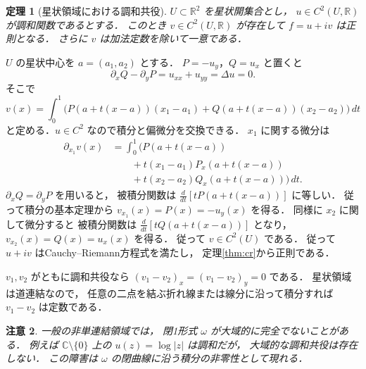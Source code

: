 \documentclass[a5paper,10pt,onecolumn]{jsarticle}
\makeatletter
\theoremstyle{mathnotetheorem}
\newtheorem{theorem}{定理}[section]
\newtheorem{remark}[theorem]{注意}
\renewcommand{\proofname}{証明}
\renewenvironment{proof}[1][\proofname]{%
  \par\pushQED{\qed}\normalfont\topsep4\p@\@plus2\p@\relax
  \trivlist\item[\hskip\labelsep\bfseries #1]\ignorespaces
}{\popQED\endtrivlist\@endpefalse}
\makeatother
\begin{document}
\begin{theorem}[星状領域における調和共役]\label{thm:conjugate}
$U\subset\mathbb R^2$ を星状開集合とし，
$u\in C^2(U,\mathbb R)$ が調和関数であるとする．
このとき $v\in C^2(U,\mathbb R)$ が存在して
$f=u+iv$ は正則となる．
さらに $v$ は加法定数を除いて一意である．
\end{theorem}
\begin{proof}
$U$ の星状中心を $a=(a_1,a_2)$ とする．
$P=-u_y$，$Q=u_x$ と置くと
\[
 \partial_xQ-\partial_yP=u_{xx}+u_{yy}=\Delta u=0.
\]
そこで
\[
 v(x)=\int_0^1
 \bigl(P(a+t(x-a))(x_1-a_1)
       +Q(a+t(x-a))(x_2-a_2)\bigr)\,dt
\]
と定める．$u\in C^2$ なので積分と偏微分を交換できる．
$x_1$ に関する微分は
\begin{align*}
 \partial_{x_1}v(x)
 &=\int_0^1\bigl(
   P(a+t(x-a))\\
 &\qquad+t(x_1-a_1)P_x(a+t(x-a))\\
 &\qquad+t(x_2-a_2)Q_x(a+t(x-a))
 \bigr)\,dt.
\end{align*}
$\partial_xQ=\partial_yP$ を用いると，
被積分関数は
$\frac d{dt}[tP(a+t(x-a))]$ に等しい．
従って積分の基本定理から
$v_{x_1}(x)=P(x)=-u_y(x)$ を得る．
同様に $x_2$ に関して微分すると
被積分関数は
$\frac d{dt}[tQ(a+t(x-a))]$ となり，
$v_{x_2}(x)=Q(x)=u_x(x)$ を得る．
従って $v\in C^2(U)$ である．
従って $u+iv$ はCauchy--Riemann方程式を満たし，
定理\ref{thm:cr}から正則である．

$v_1,v_2$ がともに調和共役なら
$(v_1-v_2)_x=(v_1-v_2)_y=0$ である．
星状領域は道連結なので，
任意の二点を結ぶ折れ線または線分に沿って積分すれば
$v_1-v_2$ は定数である．
\end{proof}

\begin{remark}
一般の非単連結領域では，
閉1形式 $\omega$ が大域的に完全でないことがある．
例えば $\mathbb C\setminus\{0\}$ 上の
$u(z)=\log|z|$ は調和だが，
大域的な調和共役は存在しない．
この障害は $\omega$ の閉曲線に沿う積分の非零性として現れる．
\end{remark}
\end{document}
